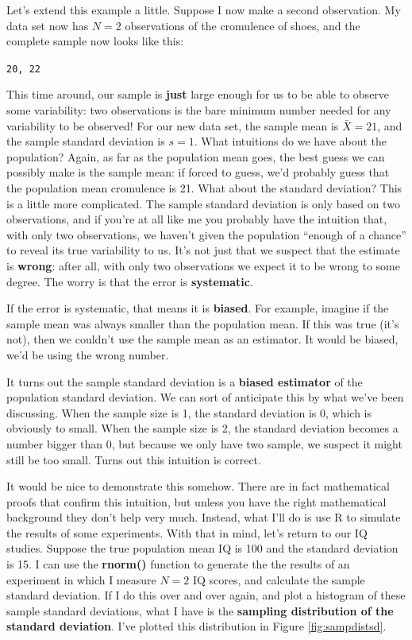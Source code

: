 \documentclass[]{book}
\begin{document}
Let's extend this example a little. Suppose I now make a second observation. My data set now has \(N=2\) observations of the cromulence of shoes, and the complete sample now looks like this:

\texttt{20,\ 22}

This time around, our sample is \textbf{just} large enough for us to be able to observe some variability: two observations is the bare minimum number needed for any variability to be observed! For our new data set, the sample mean is \(\bar{X}=21\), and the sample standard deviation is \(s=1\). What intuitions do we have about the population? Again, as far as the population mean goes, the best guess we can possibly make is the sample mean: if forced to guess, we'd probably guess that the population mean cromulence is 21. What about the standard deviation? This is a little more complicated. The sample standard deviation is only based on two observations, and if you're at all like me you probably have the intuition that, with only two observations, we haven't given the population ``enough of a chance'' to reveal its true variability to us. It's not just that we suspect that the estimate is \textbf{wrong}: after all, with only two observations we expect it to be wrong to some degree. The worry is that the error is \textbf{systematic}.

If the error is systematic, that means it is \textbf{biased}. For example, imagine if the sample mean was always smaller than the population mean. If this was true (it's not), then we couldn't use the sample mean as an estimator. It would be biased, we'd be using the wrong number.

It turns out the sample standard deviation is a \textbf{biased estimator} of the population standard deviation. We can sort of anticipate this by what we've been discussing. When the sample size is 1, the standard deviation is 0, which is obviously to small. When the sample size is 2, the standard deviation becomes a number bigger than 0, but because we only have two sample, we suspect it might still be too small. Turns out this intuition is correct.

It would be nice to demonstrate this somehow. There are in fact mathematical proofs that confirm this intuition, but unless you have the right mathematical background they don't help very much. Instead, what I'll do is use R to simulate the results of some experiments. With that in mind, let's return to our IQ studies. Suppose the true population mean IQ is 100 and the standard deviation is 15. I can use the \textbf{rnorm()} function to generate the the results of an experiment in which I measure \(N=2\) IQ scores, and calculate the sample standard deviation. If I do this over and over again, and plot a histogram of these sample standard deviations, what I have is the \textbf{sampling distribution of the standard deviation}. I've plotted this distribution in Figure \ref{fig:sampdistsd}.
\end{document}

